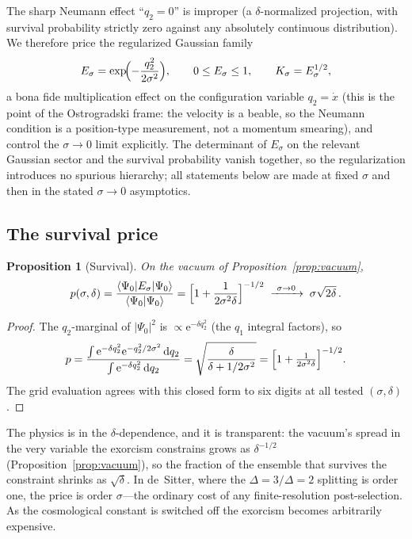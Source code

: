 \documentclass[11pt]{article}
\newtheorem{proposition}[theorem]{Proposition}
\theoremstyle{definition}
\theoremstyle{remark}
\newcommand{\ee}{\mathrm{e}}
\newcommand{\dd}{\mathrm{d}}
\begin{document}
The sharp Neumann effect ``$q_{2}=0$'' is improper (a
$\delta$-normalized projection, with survival probability strictly
zero against any absolutely continuous distribution). We therefore
price the regularized Gaussian family
\begin{equation}
E_{\sigma}=\exp\!\Bigl(-\frac{q_{2}^{2}}{2\sigma^{2}}\Bigr),
\qquad 0\le E_{\sigma}\le1,
\qquad K_{\sigma}=E_{\sigma}^{1/2},
\label{eq:Esigma}
\end{equation}
a bona fide multiplication effect on the configuration variable
$q_{2}=\dot x$ (this is the point of the Ostrogradski frame: the
velocity is a beable, so the Neumann condition is a position-type
measurement, not a momentum smearing), and control the
$\sigma\to0$ limit explicitly. The determinant of $E_{\sigma}$ on the
relevant Gaussian sector and the survival probability vanish
together, so the regularization introduces no spurious hierarchy;
all statements below are made at fixed $\sigma$ and then in the
stated $\sigma\to0$ asymptotics.

\subsection{The survival price}

\begin{proposition}[Survival]
\label{prop:survival}
On the vacuum of Proposition~\ref{prop:vacuum},
\begin{equation}
p(\sigma,\delta)
=\frac{\langle\Psi_{0}|E_{\sigma}|\Psi_{0}\rangle}
{\langle\Psi_{0}|\Psi_{0}\rangle}
=\Bigl[1+\frac{1}{2\sigma^{2}\delta}\Bigr]^{-1/2}
\;\xrightarrow{\ \sigma\to0\ }\;
\sigma\sqrt{2\delta}\,.
\label{eq:price}
\end{equation}
\end{proposition}

\begin{proof}
The $q_{2}$-marginal of $|\Psi_{0}|^{2}$ is
$\propto\ee^{-\delta q_{2}^{2}}$ (the $q_{1}$ integral factors), so
\[
p=\frac{\int\ee^{-\delta q_{2}^{2}}
\ee^{-q_{2}^{2}/2\sigma^{2}}\,\dd q_{2}}
{\int\ee^{-\delta q_{2}^{2}}\,\dd q_{2}}
=\sqrt{\frac{\delta}{\delta+1/2\sigma^{2}}}
=\Bigl[1+\tfrac{1}{2\sigma^{2}\delta}\Bigr]^{-1/2}.
\]
The grid evaluation agrees with this closed form to six digits at all
tested $(\sigma,\delta)$.
\end{proof}

The physics is in the $\delta$-dependence, and it is transparent: the
vacuum's spread in the very variable the exorcism constrains grows as
$\delta^{-1/2}$ (Proposition~\ref{prop:vacuum}), so the fraction of
the ensemble that survives the constraint shrinks as
$\sqrt{\delta}$. In de~Sitter, where the $\Delta=3/\Delta=2$
splitting is order one, the price is order $\sigma$---the ordinary
cost of any finite-resolution post-selection. As the cosmological
constant is switched off the exorcism becomes arbitrarily expensive.
\end{document}
